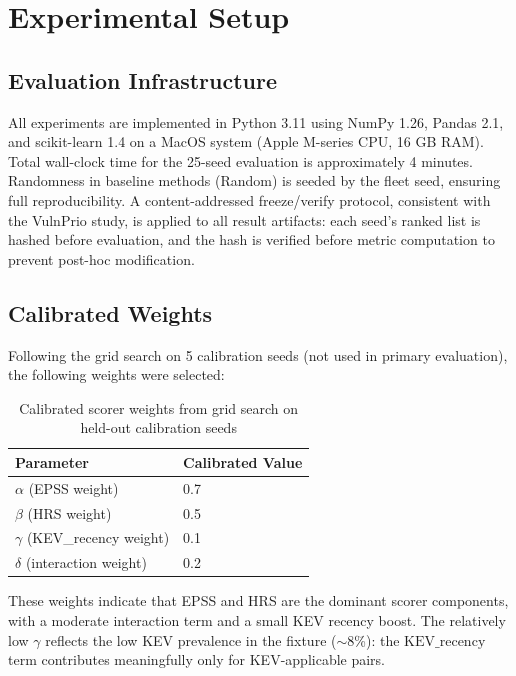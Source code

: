 \section{Experimental Setup}

\subsection{Evaluation Infrastructure}

All experiments are implemented in Python 3.11 using NumPy 1.26, Pandas 2.1, and scikit-learn 1.4 on a MacOS system (Apple M-series CPU, 16 GB RAM). Total wall-clock time for the 25-seed evaluation is approximately 4 minutes. Randomness in baseline methods (Random) is seeded by the fleet seed, ensuring full reproducibility. A content-addressed freeze/verify protocol, consistent with the VulnPrio study, is applied to all result artifacts: each seed's ranked list is hashed before evaluation, and the hash is verified before metric computation to prevent post-hoc modification.

\subsection{Calibrated Weights}

Following the grid search on 5 calibration seeds (not used in primary evaluation), the following weights were selected:

\begin{table}[!t]
 \caption{Calibrated scorer weights from grid search on held-out calibration seeds}
 \label{tab:calibrated_weights}
 \centering
 \begin{tabular}{ll}
 \toprule
 \textbf{Parameter} & \textbf{Calibrated Value} \\
 \midrule
 $\alpha$ (EPSS weight) & 0.7 \\
 $\beta$ (HRS weight) & 0.5 \\
 $\gamma$ (KEV\_recency weight) & 0.1 \\
 $\delta$ (interaction weight) & 0.2 \\
 \bottomrule
 \end{tabular}
\end{table}

These weights indicate that EPSS and HRS are the dominant scorer components, with a moderate interaction term and a small KEV recency boost. The relatively low $\gamma$ reflects the low KEV prevalence in the fixture ($\sim$8\%): the $\mathrm{KEV\_recency}$ term contributes meaningfully only for KEV-applicable pairs.

